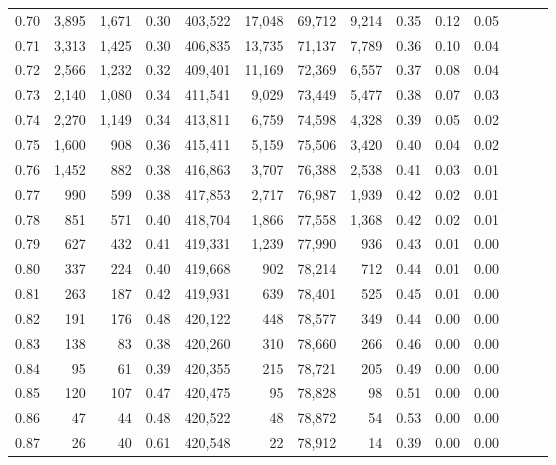 \begin{tabular}{rrrrrrrrrrrrrr}
0.70 &   3,895 &  1,671 &  0.30 &  403,522 &   17,048 &  69,712 &   9,214 &  0.35 &  0.12 &      0.05 \\
0.71 &   3,313 &  1,425 &  0.30 &  406,835 &   13,735 &  71,137 &   7,789 &  0.36 &  0.10 &      0.04 \\
0.72 &   2,566 &  1,232 &  0.32 &  409,401 &   11,169 &  72,369 &   6,557 &  0.37 &  0.08 &      0.04 \\
0.73 &   2,140 &  1,080 &  0.34 &  411,541 &    9,029 &  73,449 &   5,477 &  0.38 &  0.07 &      0.03 \\
0.74 &   2,270 &  1,149 &  0.34 &  413,811 &    6,759 &  74,598 &   4,328 &  0.39 &  0.05 &      0.02 \\
0.75 &   1,600 &    908 &  0.36 &  415,411 &    5,159 &  75,506 &   3,420 &  0.40 &  0.04 &      0.02 \\
0.76 &   1,452 &    882 &  0.38 &  416,863 &    3,707 &  76,388 &   2,538 &  0.41 &  0.03 &      0.01 \\
0.77 &     990 &    599 &  0.38 &  417,853 &    2,717 &  76,987 &   1,939 &  0.42 &  0.02 &      0.01 \\
0.78 &     851 &    571 &  0.40 &  418,704 &    1,866 &  77,558 &   1,368 &  0.42 &  0.02 &      0.01 \\
0.79 &     627 &    432 &  0.41 &  419,331 &    1,239 &  77,990 &     936 &  0.43 &  0.01 &      0.00 \\
0.80 &     337 &    224 &  0.40 &  419,668 &      902 &  78,214 &     712 &  0.44 &  0.01 &      0.00 \\
0.81 &     263 &    187 &  0.42 &  419,931 &      639 &  78,401 &     525 &  0.45 &  0.01 &      0.00 \\
0.82 &     191 &    176 &  0.48 &  420,122 &      448 &  78,577 &     349 &  0.44 &  0.00 &      0.00 \\
0.83 &     138 &     83 &  0.38 &  420,260 &      310 &  78,660 &     266 &  0.46 &  0.00 &      0.00 \\
0.84 &      95 &     61 &  0.39 &  420,355 &      215 &  78,721 &     205 &  0.49 &  0.00 &      0.00 \\
0.85 &     120 &    107 &  0.47 &  420,475 &       95 &  78,828 &      98 &  0.51 &  0.00 &      0.00 \\
0.86 &      47 &     44 &  0.48 &  420,522 &       48 &  78,872 &      54 &  0.53 &  0.00 &      0.00 \\
0.87 &      26 &     40 &  0.61 &  420,548 &       22 &  78,912 &      14 &  0.39 &  0.00 &      0.00 \\

\end{tabular}
